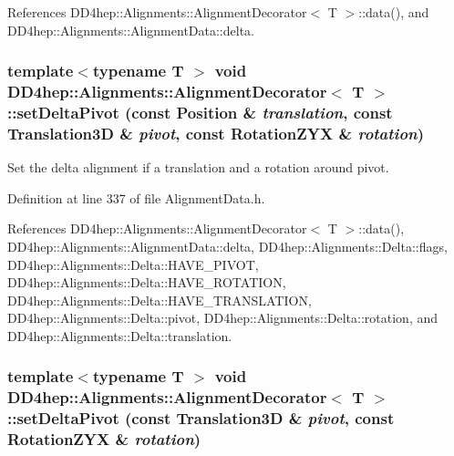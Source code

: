 References DD4hep::Alignments::AlignmentDecorator$<$ T $>$::data(), and DD4hep::Alignments::AlignmentData::delta.\hypertarget{class_d_d4hep_1_1_alignments_1_1_alignment_decorator_a5b84d2b352ba02e27815b66a94888999}{
\subsubsection[{setDeltaPivot}]{\setlength{\rightskip}{0pt plus 5cm}template$<$typename T $>$ void {\bf DD4hep::Alignments::AlignmentDecorator}$<$ {\bf T} $>$::setDeltaPivot (const Position \& {\em translation}, \/  const Translation3D \& {\em pivot}, \/  const RotationZYX \& {\em rotation})}}
\label{class_d_d4hep_1_1_alignments_1_1_alignment_decorator_a5b84d2b352ba02e27815b66a94888999}


Set the delta alignment if a translation and a rotation around pivot. 

Definition at line 337 of file AlignmentData.h.

References DD4hep::Alignments::AlignmentDecorator$<$ T $>$::data(), DD4hep::Alignments::AlignmentData::delta, DD4hep::Alignments::Delta::flags, DD4hep::Alignments::Delta::HAVE\_\-PIVOT, DD4hep::Alignments::Delta::HAVE\_\-ROTATION, DD4hep::Alignments::Delta::HAVE\_\-TRANSLATION, DD4hep::Alignments::Delta::pivot, DD4hep::Alignments::Delta::rotation, and DD4hep::Alignments::Delta::translation.\hypertarget{class_d_d4hep_1_1_alignments_1_1_alignment_decorator_aa162f47918e614d0c3c11e6b584d1a1b}{
\subsubsection[{setDeltaPivot}]{\setlength{\rightskip}{0pt plus 5cm}template$<$typename T $>$ void {\bf DD4hep::Alignments::AlignmentDecorator}$<$ {\bf T} $>$::setDeltaPivot (const Translation3D \& {\em pivot}, \/  const RotationZYX \& {\em rotation})}}
\label{class_d_d4hep_1_1_alignments_1_1_alignment_decorator_aa162f47918e614d0c3c11e6b584d1a1b}


